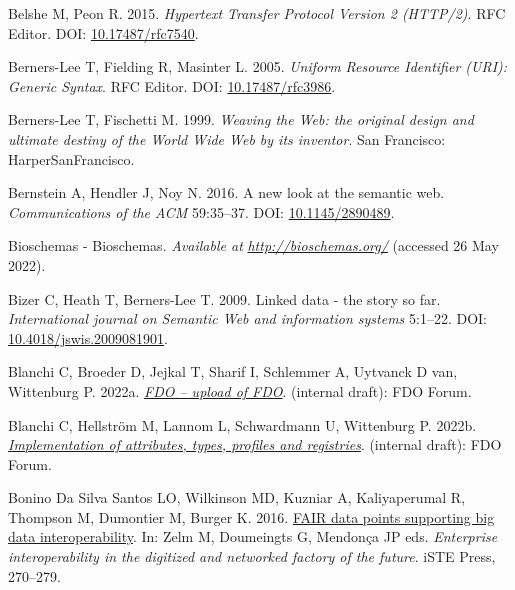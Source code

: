 \begin{CSLReferences}{1}{0}
\leavevmode{}%
Belshe M, Peon R. 2015. \emph{Hypertext Transfer Protocol Version 2 (HTTP/2)}. RFC Editor. DOI: \href{https://doi.org/10.17487/rfc7540}{10.17487/rfc7540}.

\leavevmode{}%
Berners-Lee T, Fielding R, Masinter L. 2005. \emph{Uniform Resource Identifier (URI): Generic Syntax}. RFC Editor. DOI: \href{https://doi.org/10.17487/rfc3986}{10.17487/rfc3986}.

\leavevmode{}%
Berners-Lee T, Fischetti M. 1999. \emph{Weaving the Web: the original design and ultimate destiny of the World Wide Web by its inventor}. San Francisco: HarperSanFrancisco.

\leavevmode{}%
Bernstein A, Hendler J, Noy N. 2016. A new look at the semantic web. \emph{Communications of the ACM} 59:35--37. DOI: \href{https://doi.org/10.1145/2890489}{10.1145/2890489}.

\leavevmode{}%
Bioschemas - Bioschemas. \emph{Available at} \href{http://bioschemas.org/}{\emph{http://bioschemas.org/}} (accessed 26 May 2022).

\leavevmode{}%
Bizer C, Heath T, Berners-Lee T. 2009. Linked data - the story so far. \emph{International journal on Semantic Web and information systems} 5:1--22. DOI: \href{https://doi.org/10.4018/jswis.2009081901}{10.4018/jswis.2009081901}.

\leavevmode{}%
Blanchi C, Broeder D, Jejkal T, Sharif I, Schlemmer A, Uytvanck D van, Wittenburg P. 2022a. \emph{\href{https://docs.google.com/document/d/1fDR5VHbVIa2AbLsBR58idrfn_Ib3x6Fk-_LJ4c_Ftt4/edit}{FDO -- upload of FDO}}. (internal draft): FDO Forum.

\leavevmode{}%
Blanchi C, Hellström M, Lannom L, Schwardmann U, Wittenburg P. 2022b. \emph{\href{https://docs.google.com/document/d/1RrOiwMhkl-hRzWmlluA2iXCzHK-bj7_80LlMXgWx4w4/edit}{Implementation of attributes, types, profiles and registries}}. (internal draft): FDO Forum.

\leavevmode{}%
Bonino Da Silva Santos LO, Wilkinson MD, Kuzniar A, Kaliyaperumal R, Thompson M, Dumontier M, Burger K. 2016. \href{https://www.researchgate.net/publication/\%7B309468587/_FAIR/_Data/_Points/_Supporting/_Big/_Data/_Interoperability\%7D}{FAIR data points supporting big data interoperability}. In: Zelm M, Doumeingts G, Mendonça JP eds. \emph{Enterprise interoperability in the digitized and networked factory of the future}. iSTE Press, 270--279.


\end{CSLReferences}
